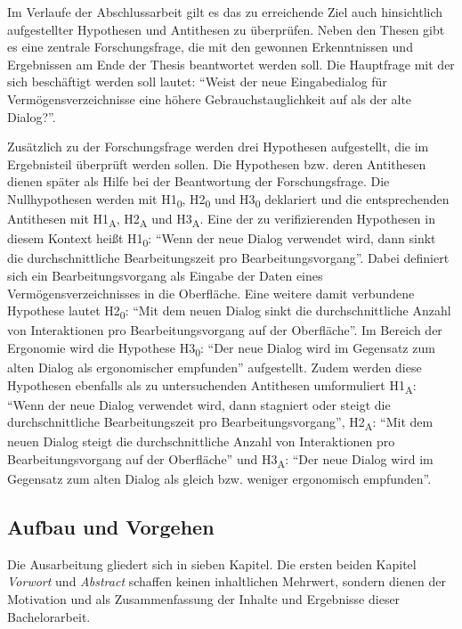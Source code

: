 Im Verlaufe der Abschlussarbeit gilt es das zu erreichende Ziel auch hinsichtlich aufgestellter Hypothesen und Antithesen zu überprüfen. Neben den Thesen gibt es eine zentrale Forschungsfrage, die mit den gewonnen Erkenntnissen und Ergebnissen am Ende der Thesis beantwortet werden soll. Die Hauptfrage mit der sich beschäftigt werden soll lautet: \enquote{Weist der neue Eingabedialog für Vermögensverzeichnisse eine höhere Gebrauchstauglichkeit auf als der alte Dialog?}.

Zusätzlich zu der Forschungsfrage werden drei Hypothesen aufgestellt, die im Ergebnisteil überprüft werden sollen. Die Hypothesen bzw. deren Antithesen dienen später als Hilfe bei der Beantwortung der Forschungsfrage. Die Nullhypothesen werden mit H1\textsubscript{0}, H2\textsubscript{0} und H3\textsubscript{0} deklariert und die entsprechenden Antithesen mit H1\textsubscript{A}, H2\textsubscript{A} und H3\textsubscript{A}. Eine der zu verifizierenden Hypothesen in diesem Kontext heißt H1\textsubscript{0}: \enquote{Wenn der neue Dialog verwendet wird, dann sinkt die durchschnittliche Bearbeitungszeit pro Bearbeitungsvorgang}. Dabei definiert sich ein Bearbeitungsvorgang als Eingabe der Daten eines Vermögensverzeichnisses in die Oberfläche. Eine weitere damit verbundene Hypothese lautet H2\textsubscript{0}: \enquote{Mit dem neuen Dialog sinkt die durchschnittliche Anzahl von Interaktionen pro Bearbeitungsvorgang auf der Oberfläche}. Im Bereich der Ergonomie wird die Hypothese H3\textsubscript{0}: \enquote{Der neue Dialog wird im Gegensatz zum alten Dialog als ergonomischer empfunden} aufgestellt. Zudem werden diese Hypothesen ebenfalls als zu untersuchenden Antithesen umformuliert H1\textsubscript{A}: \enquote{Wenn der neue Dialog verwendet wird, dann stagniert oder steigt die durchschnittliche Bearbeitungszeit pro Bearbeitungsvorgang}, H2\textsubscript{A}: \enquote{Mit dem neuen Dialog steigt die durchschnittliche Anzahl von Interaktionen pro Bearbeitungsvorgang auf der Oberfläche} und H3\textsubscript{A}: \enquote{Der neue Dialog wird im Gegensatz zum alten Dialog als gleich bzw. weniger ergonomisch empfunden}.


\subsection{Aufbau und Vorgehen}
Die Ausarbeitung gliedert sich in sieben Kapitel. Die ersten beiden Kapitel \textit{Vorwort} und \textit{Abstract} schaffen keinen inhaltlichen Mehrwert, sondern dienen der Motivation und als Zusammenfassung der Inhalte und Ergebnisse dieser Bachelorarbeit.

